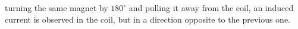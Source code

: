 turning the same magnet by $180^\circ$ and pulling it away from the coil,  %
an induced current is observed in the coil, 
but in a direction opposite to the previous one.